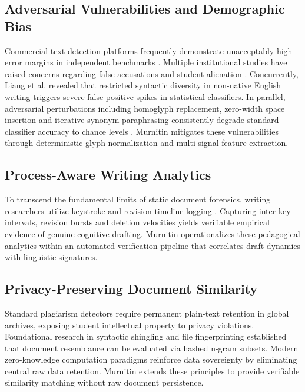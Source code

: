 \documentclass[conference]{IEEEtran}
\begin{document}
\subsection{Adversarial Vulnerabilities and Demographic Bias}
Commercial text detection platforms frequently demonstrate unacceptably high error margins in independent benchmarks \cite{weberwulff2023testing, cotton2023chatting}. Multiple institutional studies have raised concerns regarding false accusations and student alienation \cite{perkins2023academic, rudolph2023chatgpt}. Concurrently, Liang et al. \cite{liang2023gpt} revealed that restricted syntactic diversity in non-native English writing triggers severe false positive spikes in statistical classifiers. In parallel, adversarial perturbations including homoglyph replacement, zero-width space insertion and iterative synonym paraphrasing consistently degrade standard classifier accuracy to chance levels \cite{sadasivan2023can, krishna2023paraphrasing}. Murnitin mitigates these vulnerabilities through deterministic glyph normalization and multi-signal feature extraction.

\subsection{Process-Aware Writing Analytics}
To transcend the fundamental limits of static document forensics, writing researchers utilize keystroke and revision timeline logging \cite{leijten2013keystroke, allen2020keystroke}. Capturing inter-key intervals, revision bursts and deletion velocities yields verifiable empirical evidence of genuine cognitive drafting. Murnitin operationalizes these pedagogical analytics within an automated verification pipeline that correlates draft dynamics with linguistic signatures.

\subsection{Privacy-Preserving Document Similarity}
Standard plagiarism detectors require permanent plain-text retention in global archives, exposing student intellectual property to privacy violations. Foundational research in syntactic shingling \cite{broder1997syntactic} and file fingerprinting \cite{manber1994finding} established that document resemblance can be evaluated via hashed n-gram subsets. Modern zero-knowledge computation paradigms \cite{foster2023privacy} reinforce data sovereignty by eliminating central raw data retention. Murnitin extends these principles to provide verifiable similarity matching without raw document persistence.
\end{document}
